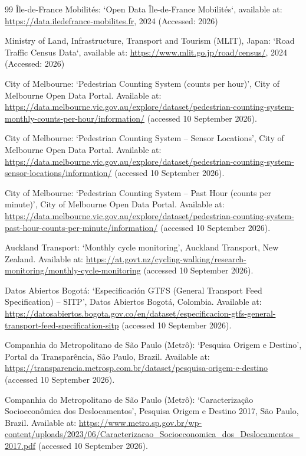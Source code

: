\documentclass[a4paper,fleqn]{cas-sc}
\begin{document}
\begin{thebibliography}{99}
Île-de-France Mobilités:  
`Open Data Île-de-France Mobilités`, available at: \url{https://data.iledefrance-mobilites.fr}, 2024 (Accessed: 2026)

Ministry of Land, Infrastructure, Transport and Tourism (MLIT), Japan:  
`Road Traffic Census Data`, available at: \url{https://www.mlit.go.jp/road/census/}, 2024 (Accessed: 2026)

City of Melbourne:
`Pedestrian Counting System (counts per hour)',
City of Melbourne Open Data Portal.
Available at:
\url{https://data.melbourne.vic.gov.au/explore/dataset/pedestrian-counting-system-monthly-counts-per-hour/information/}
(accessed 10 September 2026).

City of Melbourne:
`Pedestrian Counting System -- Sensor Locations',
City of Melbourne Open Data Portal.
Available at:
\url{https://data.melbourne.vic.gov.au/explore/dataset/pedestrian-counting-system-sensor-locations/information/}
(accessed 10 September 2026).

City of Melbourne:
`Pedestrian Counting System -- Past Hour (counts per minute)',
City of Melbourne Open Data Portal.
Available at:
\url{https://data.melbourne.vic.gov.au/explore/dataset/pedestrian-counting-system-past-hour-counts-per-minute/information/}
(accessed 10 September 2026).

Auckland Transport:
`Monthly cycle monitoring',
Auckland Transport, New Zealand.
Available at:
\url{https://at.govt.nz/cycling-walking/research-monitoring/monthly-cycle-monitoring}
(accessed 10 September 2026).

Datos Abiertos Bogot\'a:
`Especificaci\'on GTFS (General Transport Feed Specification) -- SITP',
Datos Abiertos Bogot\'a, Colombia.
Available at:
\url{https://datosabiertos.bogota.gov.co/en/dataset/especificacion-gtfs-general-transport-feed-specification-sitp}
(accessed 10 September 2026).

Companhia do Metropolitano de S\~ao Paulo (Metr\^o):
`Pesquisa Origem e Destino',
Portal da Transpar\^encia, S\~ao Paulo, Brazil.
Available at:
\url{https://transparencia.metrosp.com.br/dataset/pesquisa-origem-e-destino}
(accessed 10 September 2026).

Companhia do Metropolitano de S\~ao Paulo (Metr\^o):
`Caracteriza\c{c}\~ao Socioecon\^omica dos Deslocamentos',
Pesquisa Origem e Destino 2017, S\~ao Paulo, Brazil.
Available at:
\url{https://www.metro.sp.gov.br/wp-content/uploads/2023/06/Caracterizacao_Socioeconomica_dos_Deslocamentos_2017.pdf}
(accessed 10 September 2026).


\end{thebibliography}
\end{document}
